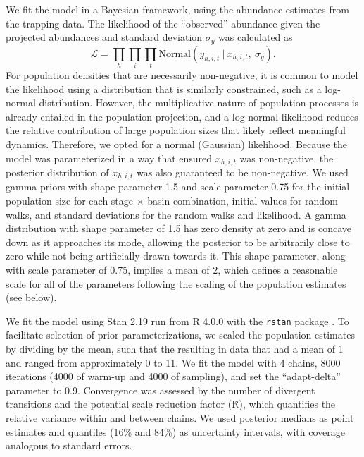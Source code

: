 \documentclass[11pt]{article}
\begin{document}
We fit the model in a Bayesian framework, 
using the abundance estimates from the trapping data. 
The likelihood of the ``observed'' abundance given the projected abundances 
and standard deviation $\sigma_y$ was calculated as
%
\begin{equation} \label{eq:likelihood}
\mathcal{L} = 
\displaystyle\prod_{h}
\displaystyle\prod_{i}
\displaystyle\prod_{t}
\text{Normal}
    \left(
        y_{h,i,t}~|~x_{h,i,t},~\sigma_y
    \right).
\end{equation}
%
For population densities that are necessarily non-negative, 
it is common to model the likelihood using a distribution that is similarly constrained,
such as a log-normal distribution. 
However, the multiplicative nature of population processes is already entailed 
in the population projection, 
and a log-normal likelihood reduces the relative contribution of large population sizes
that likely reflect meaningful dynamics.
Therefore, we opted for a normal (Gaussian) likelihood. 
Because the model was parameterized in a way that ensured
$x_{h,i,t}$ was non-negative,
the posterior distribution of $x_{h,i,t}$ was also guaranteed to be non-negative. 
We used gamma priors with shape parameter 1.5 and scale parameter 0.75
for the initial population size for each stage $\times$ basin combination, 
initial values for random walks,
and standard deviations for the random walks and likelihood.
A gamma distribution with shape parameter of 1.5 has zero density at zero 
and is concave down as it approaches its mode,
allowing the posterior to be arbitrarily close to zero 
while not being artificially drawn towards it.
This shape parameter, along with scale parameter of 0.75,
implies a mean of 2, 
which defines a reasonable scale for all of the parameters 
following the scaling of the population estimates (see below).

We fit the model using Stan 2.19 \citep{Carpenter2017}
run from R 4.0.0 with the \texttt{rstan} package \citep{Stan2018}.
To facilitate selection of prior parameterizations,
we scaled the population estimates by dividing by the mean,
such that the resulting in data that had a mean of 1
and ranged from approximately 0 to 11.
We fit the model with 4 chains, 
8000 iterations (4000 of warm-up and 4000 of sampling),
and set the ``adapt-delta'' parameter to 0.9.
Convergence was assessed by the number of divergent transitions 
and the potential scale reduction factor (\^{R}),
which quantifies the relative variance within and between chains. 
We used posterior medians as point estimates
and quantiles (16\% and 84\%) as uncertainty intervals, 
with coverage analogous to standard errors.
\end{document}

